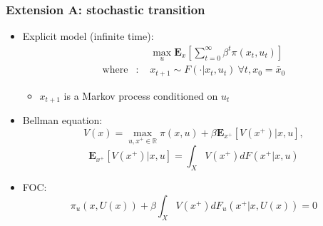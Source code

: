 \documentclass[bigger,handout]{beamer}
\begin{document}
\begin{frame}%

\frametitle{Extension A: stochastic transition}

\begin{itemize}
\item Explicit model (infinite time):%
\begin{eqnarray*}
&&\max_{u}\mathbf{E}_{x}\left[ \sum\nolimits_{t=0}^{\infty }\beta ^{t}\pi
(x_{t},u_{t})\right] \\
\text{where} &\text{: }&x_{t+1}\sim F\left( \cdot |x_{t},u_{t}\right)\ \forall t ,x_{0}=%
\bar{x}_{0}
\end{eqnarray*}

\begin{itemize}
\item $x_{t+1}$ is a Markov process conditioned on $u_{t}$
\end{itemize}

\item Bellman equation:%
\begin{equation*}
V(x)=\max_{u,x^{+}\in \mathbb{R}}\pi (x,u)+\beta \mathbf{E}_{x^{+}}\left[
V(x^{+})|x,u\right] ,
\end{equation*}%
\begin{equation*}
\mathbf{E}_{x^{+}}\left[ V(x^{+})|x,u\right] =\int_{X}V\left( x^{+}\right)
dF\left( x^{+}|x,u\right)
\end{equation*}

\item FOC:
\begin{equation*}
\pi _{u}(x,U(x))+\beta \int_{X}V\left( x^{+}\right) dF_{u}\left(
x^{+}|x,U(x)\right) =0
\end{equation*}
\end{itemize}



\end{frame}%
\end{document}
